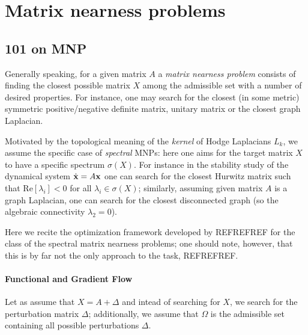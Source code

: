 \section{Matrix nearness problems}



\subsection{ 101 on MNP }

Generally speaking, for a given matrix \( A \) a \emph{matrix nearness problem} consists of finding the closest possible matrix \( X \) among the admissible set with a number of desired properties. For instance, one may search for the closest (in some metric) symmetric positive/negative definite matrix, unitary matrix or the closest graph Laplacian. 

Motivated by the topological meaning of the \emph{kernel} of Hodge Laplacians \( L_k \), we assume the specific case of \emph{spectral} MNPs: here one aims for the target matrix \( X \) to have a specific spectrum \( \sigma(X) \). For instance in the stability study of the dynamical system \( \dot{\mathbf{x}} = A \mathbf{x} \) one can search for the closest Hurwitz matrix such that \( \mathrm{Re} \left[ \lambda_i \right] < 0 \) for all \( \lambda_i \in \sigma(X) \); similarly, assuming given matrix \( A \) is a graph Laplacian, one can search for the closest disconnected graph (so the algebraic connectivity \( \lambda_2 = 0 \)).

Here we recite the optimization framework developed by REFREFREF for the class of the spectral matrix nearness problems; one should note, however, that this is by far not the only approach to the task, REFREFREF.

\paragraph{Functional and Gradient Flow}

Let as assume that \( X = A + \Delta \) and intead of searching for \( X \), we search for the perturbation matrix \( \Delta \); additionally, we assume that \( \Omega \) is the admissible set containing all possible perturbations \( \Delta \).

























